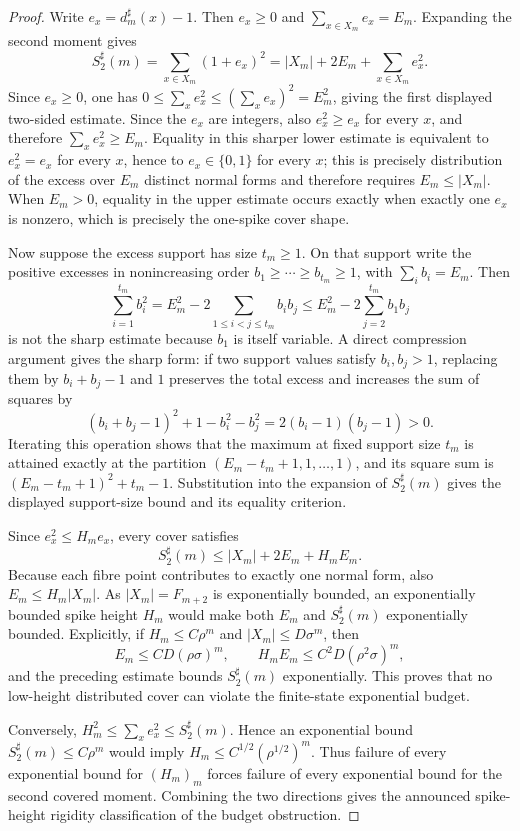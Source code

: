 \begin{proof}
Write \(e_x=d_m^\sharp(x)-1\).  Then \(e_x\ge0\) and \(
\sum_{x\in X_m}e_x=E_m\).  Expanding the second moment gives
\[
  S_2^\sharp(m)=\sum_{x\in X_m}(1+e_x)^2
  =|X_m|+2E_m+
  \sum_{x\in X_m}e_x^2 .
\]
Since \(e_x\ge0\), one has \(0\le\sum_x e_x^2\le(\sum_x e_x)^2=E_m^2\), giving the
first displayed two-sided estimate.  Since the \(e_x\) are integers, also
\(e_x^2\ge e_x\) for every \(x\), and therefore
\(\sum_x e_x^2\ge E_m\).  Equality in this sharper lower estimate is equivalent
to \(e_x^2=e_x\) for every \(x\), hence to \(e_x\in\{0,1\}\) for every \(x\); this
is precisely distribution of the excess over \(E_m\) distinct normal forms and
therefore requires \(E_m\le |X_m|\).  When \(E_m>0\), equality in the upper
estimate occurs exactly when exactly one \(e_x\) is nonzero, which is precisely
the one-spike cover shape.

Now suppose the excess support has size \(t_m\ge1\).  On that support write the
positive excesses in nonincreasing order
\(b_1\ge\cdots\ge b_{t_m}\ge1\), with \(\sum_i b_i=E_m\).  Then
\[
  \sum_{i=1}^{t_m} b_i^2
  =E_m^2-2\sum_{1\le i<j\le t_m}b_ib_j
  \le E_m^2-2\sum_{j=2}^{t_m}b_1b_j
\]
is not the sharp estimate because \(b_1\) is itself variable.  A direct
compression argument gives the sharp form: if two support values satisfy
\(b_i,b_j>1\), replacing them by \(b_i+b_j-1\) and \(1\) preserves the total
excess and increases the sum of squares by
\[
  (b_i+b_j-1)^2+1-b_i^2-b_j^2
  =2(b_i-1)(b_j-1)>0 .
\]
Iterating this operation shows that the maximum at fixed support size \(t_m\) is
attained exactly at the partition
\((E_m-t_m+1,1,\ldots,1)\), and its square sum is
\((E_m-t_m+1)^2+t_m-1\).  Substitution into the expansion of
\(S_2^\sharp(m)\) gives the displayed support-size bound and its equality
criterion.

Since \(e_x^2\le H_m e_x\), every cover satisfies
\[
  S_2^\sharp(m)\le |X_m|+2E_m+H_mE_m .
\]
Because each fibre point contributes to exactly one normal form, also
\(E_m\le H_m|X_m|\).  As \(|X_m|=F_{m+2}\) is exponentially bounded, an
exponentially bounded spike height \(H_m\) would make both \(E_m\) and
\(S_2^\sharp(m)\) exponentially bounded.  Explicitly, if
\(H_m\le C\rho^m\) and \(|X_m|\le D\sigma^m\), then
\[
  E_m\le CD(\rho\sigma)^m,
  \qquad
  H_mE_m\le C^2D(\rho^2\sigma)^m,
\]
and the preceding estimate bounds \(S_2^\sharp(m)\) exponentially.  This proves
that no low-height distributed cover can violate the finite-state exponential
budget.

Conversely, \(H_m^2\le\sum_x e_x^2\le S_2^\sharp(m)\).  Hence an exponential
bound \(S_2^\sharp(m)\le C\rho^m\) would imply
\(H_m\le C^{1/2}(\rho^{1/2})^m\).  Thus failure of every exponential bound for
\((H_m)_m\) forces failure of every exponential bound for the second covered
moment.  Combining the two directions gives the announced spike-height rigidity
classification of the budget obstruction.


\end{proof}

